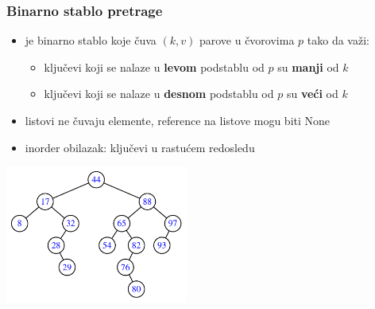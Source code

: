 \documentclass[compress]{beamer}
\begin{document}
\begin{frame}[fragile]
  \frametitle{Binarno stablo pretrage}
  \begin{itemize}
    \item {} je binarno stablo koje čuva $(k, v)$ parove u čvorovima $p$ tako da važi:
    \begin{itemize}
      \item ključevi koji se nalaze u \textbf{levom} podstablu od $p$ su \textbf{manji} od $k$
      \item ključevi koji se nalaze u \textbf{desnom} podstablu od $p$ su \textbf{veći} od $k$
    \end{itemize}
    \item listovi ne čuvaju elemente, reference na listove mogu biti None
    \item inorder obilazak: ključevi u rastućem redosledu 
  \end{itemize}
  \begin{center}
    \includegraphics[width=6cm]{asp-11-pic02.pdf}
  \end{center}
\end{frame}
\end{document}
